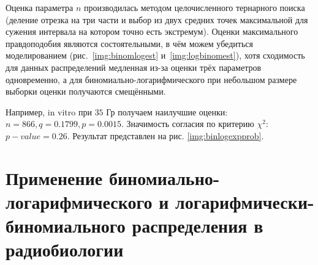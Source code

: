 \documentclass[12pt, specialist, subf, substylefile = spbu_report.rtx]{disser}
\begin{document}
	Оценка параметра $n$ производилась методом целочисленного тернарного поиска (деление отрезка на три части и выбор из двух средних точек максимальной для сужения интервала на котором точно есть экстремум). Оценки максимального правдоподобия являются состоятельными, в чём можем убедиться моделированием (рис.~\ref{img:binomlogest} и~\ref{img:logbinomest}), хотя сходимость для данных распределений медленная из-за оценки трёх параметров одновременно, а для биномиально-логарифмического при небольшом размере выборки оценки получаются смещёнными.
	
	Например, in vitro при $ 35 $ Гр получаем наилучшие оценки: $ n = 866, q = 0.1799, p = 0.0015$. Значимость согласия по критерию $ \chi ^2 $: $ p-value = 0.26 $. Результат представлен на рис. \ref{img:binlogexpprob}.
	
	\section{Применение биномиально-логарифмического и логарифмически-биномиального распределения в радиобиологии}
	
	\label{radiobiology}
	
\end{document}
